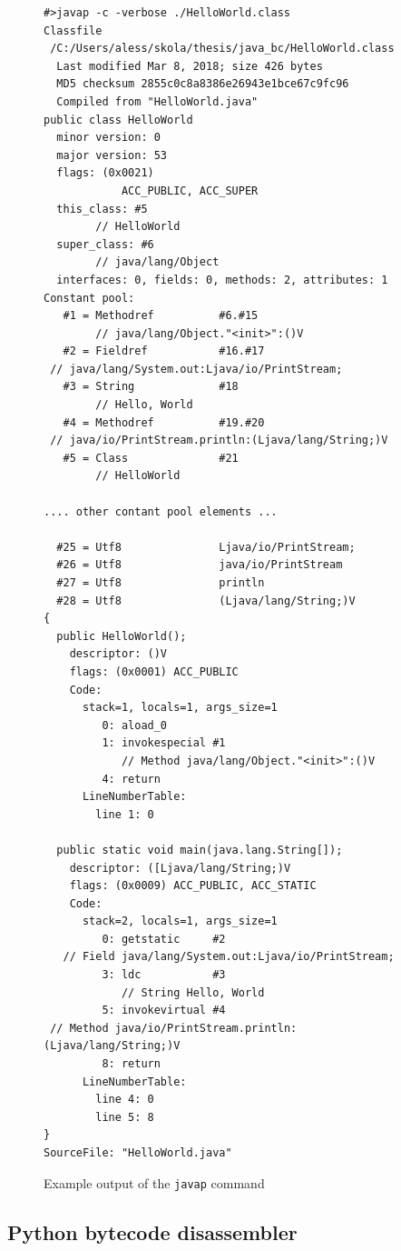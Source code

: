 \documentclass[thesis=M,english]{FITthesis}[2018/10/20]
\newcommand{\code}[1]{\texttt{#1}}
\begin{document}

\begin{figure}[!htb]
\begin{lstlisting}
#>javap -c -verbose ./HelloWorld.class
Classfile
 /C:/Users/aless/skola/thesis/java_bc/HelloWorld.class
  Last modified Mar 8, 2018; size 426 bytes
  MD5 checksum 2855c0c8a8386e26943e1bce67c9fc96
  Compiled from "HelloWorld.java"
public class HelloWorld
  minor version: 0
  major version: 53
  flags: (0x0021)
  			ACC_PUBLIC, ACC_SUPER
  this_class: #5
  		// HelloWorld
  super_class: #6
  		// java/lang/Object
  interfaces: 0, fields: 0, methods: 2, attributes: 1
Constant pool:
   #1 = Methodref          #6.#15
   		// java/lang/Object."<init>":()V
   #2 = Fieldref           #16.#17
 // java/lang/System.out:Ljava/io/PrintStream;
   #3 = String             #18
   		// Hello, World
   #4 = Methodref          #19.#20
 // java/io/PrintStream.println:(Ljava/lang/String;)V
   #5 = Class              #21
   		// HelloWorld

.... other contant pool elements ...

  #25 = Utf8               Ljava/io/PrintStream;
  #26 = Utf8               java/io/PrintStream
  #27 = Utf8               println
  #28 = Utf8               (Ljava/lang/String;)V
{
  public HelloWorld();
    descriptor: ()V
    flags: (0x0001) ACC_PUBLIC
    Code:
      stack=1, locals=1, args_size=1
         0: aload_0
         1: invokespecial #1
         	// Method java/lang/Object."<init>":()V
         4: return
      LineNumberTable:
        line 1: 0

  public static void main(java.lang.String[]);
    descriptor: ([Ljava/lang/String;)V
    flags: (0x0009) ACC_PUBLIC, ACC_STATIC
    Code:
      stack=2, locals=1, args_size=1
         0: getstatic     #2
   // Field java/lang/System.out:Ljava/io/PrintStream;
         3: ldc           #3
         	// String Hello, World
         5: invokevirtual #4
 // Method java/io/PrintStream.println:(Ljava/lang/String;)V
         8: return
      LineNumberTable:
        line 4: 0
        line 5: 8
}
SourceFile: "HelloWorld.java"

\end{lstlisting}
	\caption{Example output of the \code{javap} command}\label{fig:javap-output-example}
\end{figure}


\subsection{Python bytecode disassembler}
\end{document}
